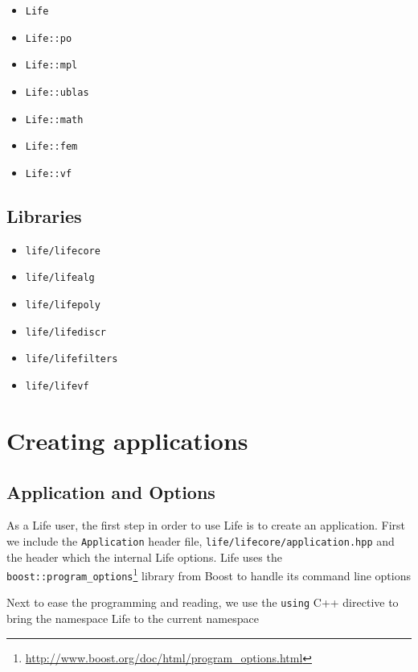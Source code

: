 \documentclass[11pt]{article}
\newcommand{\cpp}{C{\hspace{-.3em}\vspace{-.2em}\tiny++}\xspace}
\begin{document}
\begin{itemize}
\item \lstinline!Life!
\item \lstinline!Life::po!
\item \lstinline!Life::mpl!
\item \lstinline!Life::ublas!
\item \lstinline!Life::math!
\item \lstinline!Life::fem!
\item \lstinline!Life::vf!

\end{itemize}

\subsection{Libraries}

\begin{itemize}
\item \lstinline!life/lifecore!
\item \lstinline!life/lifealg!
\item \lstinline!life/lifepoly!
\item \lstinline!life/lifediscr!
\item \lstinline!life/lifefilters!
\item \lstinline!life/lifevf!
\end{itemize}

\section{Creating applications}
\label{sec:creat-appl}



\subsection{Application and Options}
\label{sec:options}

As a Life user, the first step in order to use Life is to create an
application. First we include the \lstinline!Application! header file,
\lstinline!life/lifecore/application.hpp! and the header which the
internal Life options. Life uses the
\lstinline!boost::program_options!\footnote{\url{http://www.boost.org/doc/html/program_options.html}}
library from Boost to handle its command line options




Next to ease the programming and reading, we use the \lstinline!using!
\cpp directive to bring the namespace Life to the current namespace
\end{document}
